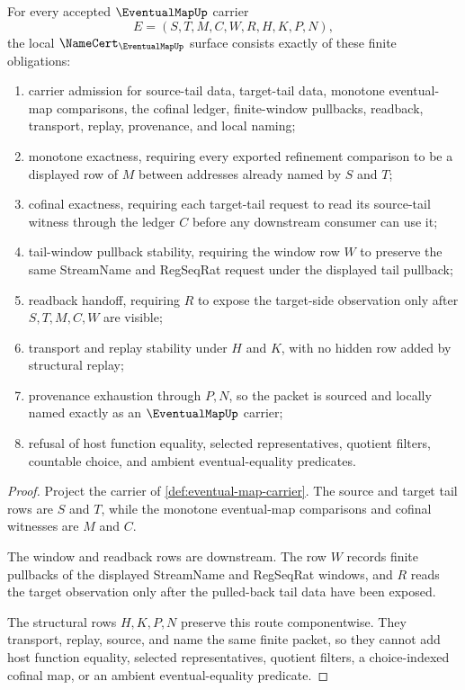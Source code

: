 \begin{theorem}
\label{thm:eventual-map-namecert-obligations}
For every accepted $\EventualMapUp$ carrier
$$
E=(S,T,M,C,W,R,H,K,P,N),
$$
the local $\NameCert_{\EventualMapUp}$ surface consists exactly of these finite obligations:
\begin{enumerate}
\item carrier admission for source-tail data, target-tail data, monotone eventual-map comparisons, the cofinal ledger, finite-window pullbacks, readback, transport, replay, provenance, and local naming;
\item monotone exactness, requiring every exported refinement comparison to be a displayed row of $M$ between addresses already named by $S$ and $T$;
\item cofinal exactness, requiring each target-tail request to read its source-tail witness through the ledger $C$ before any downstream consumer can use it;
\item tail-window pullback stability, requiring the window row $W$ to preserve the same StreamName and RegSeqRat request under the displayed tail pullback;
\item readback handoff, requiring $R$ to expose the target-side observation only after $S,T,M,C,W$ are visible;
\item transport and replay stability under $H$ and $K$, with no hidden row added by structural replay;
\item provenance exhaustion through $P,N$, so the packet is sourced and locally named exactly as an $\EventualMapUp$ carrier;
\item refusal of host function equality, selected representatives, quotient filters, countable choice, and ambient eventual-equality predicates.
\end{enumerate}
\end{theorem}
\begin{proof}
Project the carrier of \autoref{def:eventual-map-carrier}. The source and target tail rows are $S$ and $T$, while the monotone eventual-map comparisons and cofinal witnesses are $M$ and $C$.

The window and readback rows are downstream. The row $W$ records finite pullbacks of the displayed StreamName and RegSeqRat windows, and $R$ reads the target observation only after the pulled-back tail data have been exposed.

The structural rows $H,K,P,N$ preserve this route componentwise. They transport, replay, source, and name the same finite packet, so they cannot add host function equality, selected representatives, quotient filters, a choice-indexed cofinal map, or an ambient eventual-equality predicate.
\end{proof}

